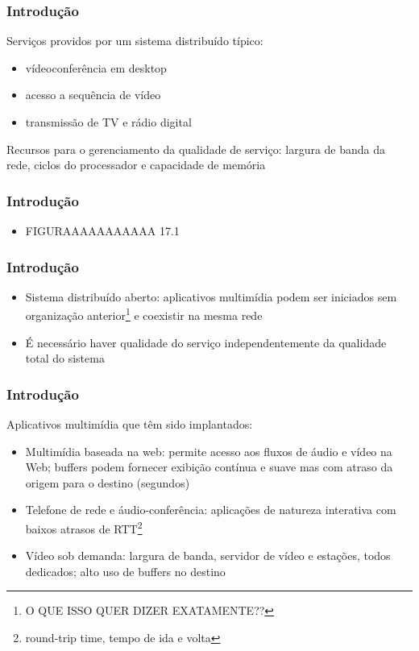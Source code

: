 \documentclass[]{beamer}
\begin{document}
\begin{frame}
  \frametitle{Introdução}
  Serviços providos por um sistema distribuído típico:
  \begin{itemize}
    \item vídeoconferência em desktop
    \item acesso a sequência de vídeo
    \item transmissão de TV e rádio digital
  \end{itemize}
  Recursos para o gerenciamento da qualidade de serviço: largura de banda da rede, ciclos do
processador e capacidade de memória
\end{frame}

\begin{frame}
  \frametitle{Introdução}
\begin{itemize}
  \item FIGURAAAAAAAAAAA 17.1
\end{itemize}
\end{frame}

\begin{frame}
  \frametitle{Introdução}
\begin{itemize}
  \item Sistema distribuído aberto: aplicativos multimídia podem ser iniciados sem organização
anterior\footnote{O QUE ISSO QUER DIZER EXATAMENTE??} e coexistir na mesma rede
  \item É necessário haver qualidade do serviço independentemente da qualidade total do sistema
\end{itemize}
\end{frame}

\begin{frame}
  \frametitle{Introdução}
Aplicativos multimídia que têm sido implantados:
\begin{itemize}
  \item Multimídia baseada na web: permite acesso aos fluxos de áudio e vídeo na Web; buffers
podem fornecer exibição contínua e suave mas com atraso da origem para o destino (segundos)
  \item Telefone de rede e áudio-conferência: aplicações de natureza interativa com baixos
atrasos de RTT\footnote{round-trip time, tempo de ida e volta}
  \item Vídeo sob demanda: largura de banda, servidor de vídeo e estações, todos dedicados;
alto uso de buffers no destino
\end{itemize}
\end{frame}
\end{document}

